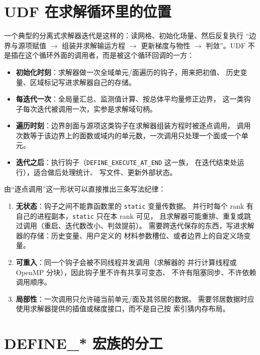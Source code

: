 \documentclass[12pt,a4paper,fontset=fandol]{ctexbook}
\newcommand{\Tp}[1]{\texttt{#1}}
\begin{document}
\section{UDF 在求解循环里的位置}
\label{sec:ch03-udf-loop}

一个典型的分离式求解器迭代是这样的：读网格、初始化场量、然后反复执行
``边界与源项赋值 $\rightarrow$ 组装并求解输运方程 $\rightarrow$ 更新梯度与物性
$\rightarrow$ 判敛''。UDF 不是插在这个循环外面的调用者，而是被这个循环回调的一方：

\begin{itemize}
  \item \textbf{初始化时刻}：求解器做一次全域单元/面遍历的钩子，用来把初值、
        历史变量、区域标记写进求解器自己的存储。
  \item \textbf{每迭代一次}：全局量汇总、监测值计算、按总体平均量修正边界，
        这一类钩子每次迭代被调用一次，实参是求解域句柄。
  \item \textbf{遍历时刻}：边界剖面与源项这类钩子在求解器组装方程时被逐点调用，
        调用次数等于该边界上的面数或域内的单元数，一次调用只处理一个面或一个单元。
  \item \textbf{迭代之后}：执行钩子（\Tp{DEFINE\_EXECUTE\_AT\_END} 这一族，
        在迭代结束处运行），适合做后处理统计、
        写文件、更新外部状态。
\end{itemize}

由``逐点调用''这一形状可以直接推出三条写法纪律：

\begin{enumerate}
  \item \textbf{无状态}：钩子之间不能靠函数里的 \Tp{static} 变量传数据。
        并行时每个 rank 有自己的进程副本，\Tp{static} 只在本 rank 可见，
        且求解器可能重排、重复或跳过调用（重启、迭代数改小、判敛提前）。
        需要跨迭代保存的东西，写进求解器的存储：历史变量、用户定义的
        材料参数槽位、或者边界上的自定义场变量。
  \item \textbf{可重入}：同一个钩子会被不同线程并发调用（求解器的
        并行计算线程或 OpenMP 分块），因此钩子里不许有共享可变态、
        不许有阻塞同步、不许依赖调用顺序。
  \item \textbf{局部性}：一次调用只允许碰当前单元/面及其邻居的数据。
        需要邻居数据时应使用求解器提供的插值或梯度接口，而不是自己按
        索引猜内存布局。
\end{enumerate}

\section{DEFINE\_* 宏族的分工}
\label{sec:ch03-define-family}
\end{document}
